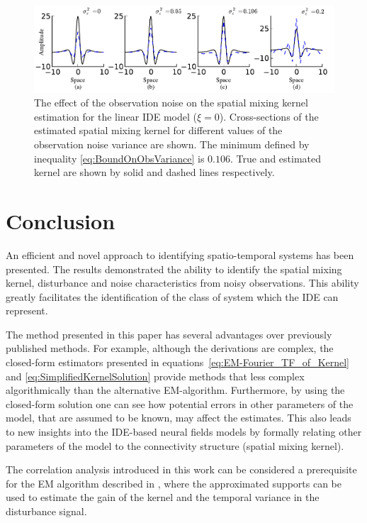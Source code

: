 \documentclass[10pt,twocolumn,twoside]{IEEEtran}
\begin{document}
{\begin{figure}[]
	\centering
		\includegraphics[scale=1]{./Graph/NoiseEffectIsoKernel.pdf}
	\caption{The effect of the observation noise on the spatial mixing kernel estimation for the linear IDE model ($\xi=0$).
Cross-sections of the estimated spatial mixing kernel for different values of the observation noise variance are shown.
The minimum defined by inequality \eqref{eq:BoundOnObsVariance} is $0.106$.
True and estimated kernel are shown by solid and dashed lines respectively.}
	\label{fig:ObservationNoiseEffectonLinearIDE}
\end{figure}
\section{Conclusion}
An efficient and novel approach to identifying spatio-temporal systems has been presented.
The results demonstrated the ability to identify the spatial mixing kernel, disturbance and noise characteristics from noisy observations.
This ability greatly facilitates the identification of the class of system which the IDE can represent.


The method presented in this paper has several advantages over previously published methods.
For example, although the derivations are complex, the closed-form estimators presented in equations~\eqref{eq:EM-Fourier_TF_of_Kernel} and \eqref{eq:SimplifiedKernelSolution} provide methods that less complex algorithmically than the alternative EM-algorithm.
Furthermore, by using the closed-form solution one can see how potential errors in other parameters of the model, that are assumed to be known, may affect the estimates.
This also leads to new insights into the IDE-based neural fields models by formally relating other parameters of the model to the connectivity structure (spatial mixing kernel).

 
The correlation analysis introduced in this work can be considered a prerequisite for the EM algorithm described in \cite{Dewar2009}, where the approximated supports can be used to estimate the gain of the kernel and the temporal variance in the disturbance signal.


}
\end{document}
